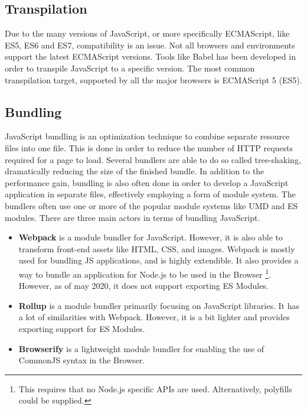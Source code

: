\subsection{Transpilation}
\label{sec:theory-transpilation}
Due to the many versions of JavaScript, or more specifically ECMAScript, like ES5, ES6 and ES7, compatibility is an issue. Not all browsers and environments support the latest ECMAScript versions. Tools like Babel \cite{babel} has been developed in order to transpile JavaScript to a specific version. The most common transpilation target, supported by all the major browsers is ECMAScript 5 (ES5).

\subsection{Bundling}
\label{sec:theory-bundling}
JavaScript bundling is an optimization technique to combine separate resource files into one file. This is done in order to reduce the number of HTTP requests required for a page to load. Several bundlers are able to do so called tree-shaking, dramatically reducing the size of the finished bundle. In addition to the performance gain, bundling is also often done in order to develop a JavaScript application in separate files, effectively employing a form of module system. The bundlers often use one or more of the popular module systems like UMD and ES modules. There are three main actors in terms of bundling JavaScript.
\begin{itemize}
    \item \textbf{Webpack} \cite{webpack} is a module bundler for JavaScript. However, it is also able to transform front-end assets like HTML, CSS, and images. Webpack is mostly used for bundling JS applications, and is highly extendible. It also provides a way to bundle an application for Node.js to be used in the Browser \footnote{This requires that no Node.js specific APIs are used. Alternatively, polyfills could be supplied.}. However, as of may 2020, it does not support exporting ES Modules.
    \item \textbf{Rollup} \cite{rollup} is a module bundler primarily focusing on JavaScript libraries. It has a lot of similarities with Webpack. However, it is a bit lighter and provides exporting support for ES Modules.
    \item \textbf{Browserify} \cite{browserify} is a lightweight module bundler for enabling the use of CommonJS syntax in the Browser.
\end{itemize}

